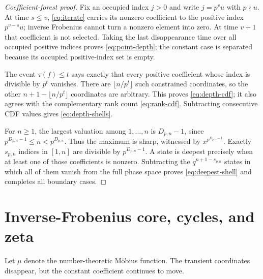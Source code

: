 \documentclass[10pt,a4paper]{amsart}
\theoremstyle{definition}
\theoremstyle{remark}
\newcommand{\mob}{\mu}
\begin{document}
\begin{proof}[Coefficient-forest proof]
Fix an occupied index $j>0$ and write $j=p^vu$ with $p\nmid u$.  At time
$s\le v$, \eqref{eq:iterate} carries its nonzero coefficient to the
positive index $p^{v-s}u$; inverse Frobenius cannot turn a nonzero element
into zero.  At time $v+1$ that coefficient is not selected.  Taking the
last disappearance time over all occupied positive indices proves
\eqref{eq:point-depth}; the constant case is separated because its occupied
positive-index set is empty.

The event $\tau(f)\le t$ says exactly that every positive coefficient whose
index is divisible by $p^t$ vanishes.  There are
$\lfloor n/p^t\rfloor$ such constrained coordinates, so the other
$n+1-\lfloor n/p^t\rfloor$ coordinates are arbitrary.  This proves
\eqref{eq:depth-cdf}; it also agrees with the complementary rank count
\eqref{eq:rank-cdf}.  Subtracting consecutive CDF values gives
\eqref{eq:depth-shells}.

For $n\ge1$, the largest valuation among $1,\ldots,n$ is
$D_{p,n}-1$, since $p^{D_{p,n}-1}\le n<p^{D_{p,n}}$.  Thus the maximum is
sharp, witnessed by $x^{p^{D_{p,n}-1}}$.  Exactly $s_{p,n}$ indices in
$[1,n]$ are divisible by $p^{D_{p,n}-1}$.  A state is deepest precisely
when at least one of those coefficients is nonzero.  Subtracting the
$q^{n+1-s_{p,n}}$ states in which all of them vanish from the full phase
space proves \eqref{eq:deepest-shell} and completes all boundary cases.
\end{proof}

\section{Inverse-Frobenius core, cycles, and zeta}
\label{sec:periodic}

Let $\mob$ denote the number-theoretic M\"obius function.  The transient
coordinates disappear, but the constant coefficient continues to move.
\end{document}
